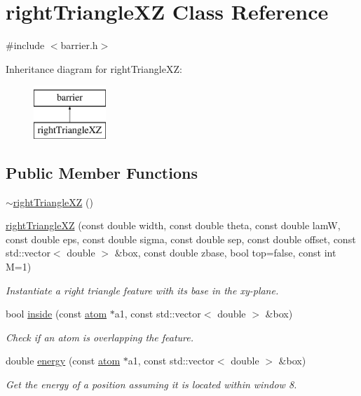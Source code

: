 \hypertarget{classright_triangle_x_z}{\section{right\-Triangle\-X\-Z Class Reference}
\label{classright_triangle_x_z}
}


{\ttfamily \#include $<$barrier.\-h$>$}

Inheritance diagram for right\-Triangle\-X\-Z\-:\begin{figure}[H]
\begin{center}
\leavevmode
\includegraphics[height=2.000000cm]{classright_triangle_x_z}
\end{center}
\end{figure}
\subsection*{Public Member Functions}
\begin{DoxyCompactItemize}
\item 
\hyperlink{classright_triangle_x_z_a3ce16261ab80928bbfbc2b0d0aa67399}{$\sim$right\-Triangle\-X\-Z} ()
\item 
\hyperlink{classright_triangle_x_z_a8f252f8cb6cbe2861d05565484accc17}{right\-Triangle\-X\-Z} (const double width, const double theta, const double lam\-W, const double eps, const double sigma, const double sep, const double offset, const std\-::vector$<$ double $>$ \&box, const double zbase, bool top=false, const int M=1)
\begin{DoxyCompactList}\small\item\em Instantiate a right triangle feature with its base in the xy-\/plane. \end{DoxyCompactList}\item 
bool \hyperlink{classright_triangle_x_z_a574bcc38639a6d599aaa38fd9085ff63}{inside} (const \hyperlink{classatom}{atom} $\ast$a1, const std\-::vector$<$ double $>$ \&box)
\begin{DoxyCompactList}\small\item\em Check if an atom is overlapping the feature. \end{DoxyCompactList}\item 
double \hyperlink{classright_triangle_x_z_a0a15ebff4238aeb15cad052cf9904f43}{energy} (const \hyperlink{classatom}{atom} $\ast$a1, const std\-::vector$<$ double $>$ \&box)
\begin{DoxyCompactList}\small\item\em Get the energy of a position assuming it is located within window 8. \end{DoxyCompactList}\end{DoxyCompactItemize}
